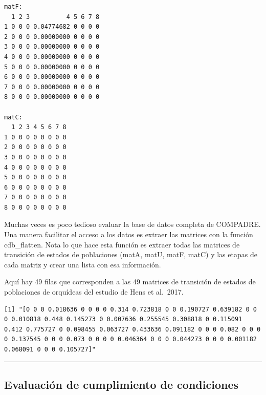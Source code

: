 \documentclass[
  12pt,
  letterpaper,
]{book}
\newenvironment{Shaded}{\begin{snugshade}}{\end{snugshade}}
\newcommand{\CommentTok}[1]{\textcolor[rgb]{0.37,0.37,0.37}{#1}}
\newcommand{\DecValTok}[1]{\textcolor[rgb]{0.68,0.00,0.00}{#1}}
\newcommand{\FunctionTok}[1]{\textcolor[rgb]{0.28,0.35,0.67}{#1}}
\newcommand{\NormalTok}[1]{\textcolor[rgb]{0.00,0.23,0.31}{#1}}
\newcommand{\OtherTok}[1]{\textcolor[rgb]{0.00,0.23,0.31}{#1}}
\newcommand{\SpecialCharTok}[1]{\textcolor[rgb]{0.37,0.37,0.37}{#1}}
\begin{document}
\begin{verbatim}
matF:
  1 2 3          4 5 6 7 8
1 0 0 0 0.04774682 0 0 0 0
2 0 0 0 0.00000000 0 0 0 0
3 0 0 0 0.00000000 0 0 0 0
4 0 0 0 0.00000000 0 0 0 0
5 0 0 0 0.00000000 0 0 0 0
6 0 0 0 0.00000000 0 0 0 0
7 0 0 0 0.00000000 0 0 0 0
8 0 0 0 0.00000000 0 0 0 0

matC:
  1 2 3 4 5 6 7 8
1 0 0 0 0 0 0 0 0
2 0 0 0 0 0 0 0 0
3 0 0 0 0 0 0 0 0
4 0 0 0 0 0 0 0 0
5 0 0 0 0 0 0 0 0
6 0 0 0 0 0 0 0 0
7 0 0 0 0 0 0 0 0
8 0 0 0 0 0 0 0 0
\end{verbatim}

Muchas veces es poco tedioso evaluar la base de datos completa de
COMPADRE. Una manera facilitar el acceso a los datos es extraer las
matrices con la función cdb\_flatten. Nota lo que hace esta función es
extraer todas las matrices de transición de estados de poblaciones
(matA, matU, matF, matC) y las etapas de cada matriz y crear una lista
con esa información.

Aquí hay 49 filas que corresponden a las 49 matrices de transición de
estados de poblaciones de orquídeas del estudio de Hens et al.~2017.

\begin{Shaded}
\end{Shaded}

\begin{verbatim}
[1] "[0 0 0 0.018636 0 0 0 0 0.314 0.723818 0 0 0.190727 0.639182 0 0 0 0.010818 0.448 0.145273 0 0.007636 0.255545 0.308818 0 0.115091 0.412 0.775727 0 0.098455 0.063727 0.433636 0.091182 0 0 0 0.082 0 0 0 0 0.137545 0 0 0 0.073 0 0 0 0 0.046364 0 0 0 0.044273 0 0 0 0.001182 0.068091 0 0 0 0.105727]"
\end{verbatim}

\begin{center}\rule{0.5\linewidth}{0.5pt}\end{center}

\subsection{Evaluación de cumplimiento de
condiciones}\label{evaluaciuxf3n-de-cumplimiento-de-condiciones}
\end{document}

